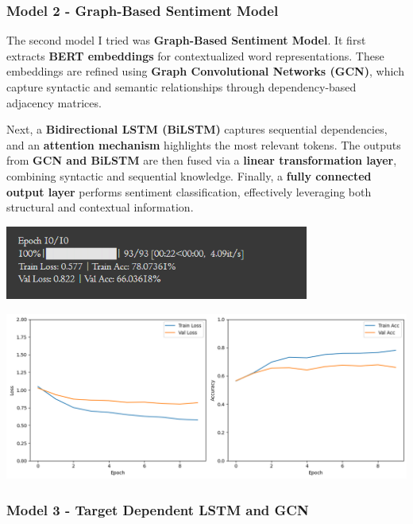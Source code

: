 \documentclass{article}
\begin{document}
\subsubsection{Model 2 - Graph-Based Sentiment Model }
The second model I tried was \textbf{Graph-Based Sentiment Model}. It first extracts \textbf{BERT embeddings} for contextualized word representations. These embeddings are refined using \textbf{Graph Convolutional Networks (GCN)}, which capture syntactic and semantic relationships through dependency-based adjacency matrices.

Next, a \textbf{Bidirectional LSTM (BiLSTM)} captures sequential dependencies, and an \textbf{attention mechanism} highlights the most relevant tokens. The outputs from \textbf{GCN and BiLSTM} are then fused via a \textbf{linear transformation layer}, combining syntactic and sequential knowledge. Finally, a \textbf{fully connected output layer} performs sentiment classification, effectively leveraging both structural and contextual information.
\begin{center}
\begin{center}
\includegraphics[width=0.75\textwidth]{Model_2_Accuracy.png}
\end{center}
\includegraphics[width=1\textwidth]{Architecture 2.png}
\end{center}
\subsubsection{Model 3 - Target Dependent LSTM and GCN}
\end{document}
